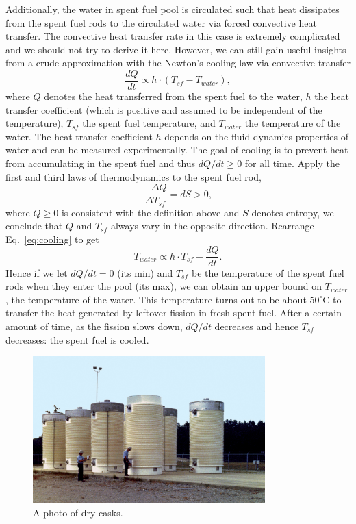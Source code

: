 \documentclass[nofootinbib,preprint,aps]{revtex4-1}
\begin{document}
    Additionally, the water in spent fuel pool is circulated such that heat dissipates from the spent
    fuel rods to the circulated water via forced convective heat transfer.
    The convective heat transfer rate in this case is
    extremely complicated and we should not try to derive it here. However, we can still gain useful insights
    from a crude approximation with the Newton's cooling law via convective transfer
    \begin{equation}
        \label{eq:cooling}
        \frac{dQ}{dt} \propto h\cdot (T_{sf} - T_{water}),
    \end{equation}
    where $Q$ denotes the heat transferred from the spent fuel to the water,
    $h$ the heat transfer coefficient (which is positive and assumed to be independent
    of the temperature), $T_{sf}$ the spent fuel temperature, and $T_{water}$ the temperature
    of the water.\cite[chapt. 1]{l13}
    The heat transfer coefficient $h$ depends on the fluid dynamics properties of water and can
    be measured experimentally. The goal of
    cooling is to prevent heat from accumulating in the spent fuel and thus $dQ/dt \geq 0$ for all time.
    Apply the first and third laws of thermodynamics to the spent fuel rod,
    \begin{equation}
        \label{eq:first}
        \frac{-\Delta Q}{\Delta T_{sf}} = dS > 0,
    \end{equation}
    where $Q\geq 0$ is consistent with the definition above and $S$ denotes entropy, we conclude that $Q$ and $T_{sf}$ always vary in the opposite direction. Rearrange Eq.~\ref{eq:cooling} to get
    \begin{equation}
        T_{water} \propto h\cdot T_{sf} - \frac{dQ}{dt}.
    \end{equation}
    Hence if we let $dQ/dt=0$ (its min) and $T_{sf}$ be the temperature of the spent
    fuel rods when they enter the pool (its max), we
    can obtain an upper bound on $T_{water}$, the temperature of the water. This temperature turns out to
    be about $50^{\circ}$C to transfer the heat generated by leftover fission in fresh spent fuel. After a
    certain amount of time, as the fission slows down, $dQ/dt$ decreases and hence $T_{sf}$ decreases: the spent
    fuel is cooled.
        \begin{figure}
            \centering
            \includegraphics[width=0.8\textwidth]{dry_cask.jpg}
            \caption{A photo of dry casks.\cite{dcpic}}
            \label{fig:cask}
        \end{figure}
\end{document}
